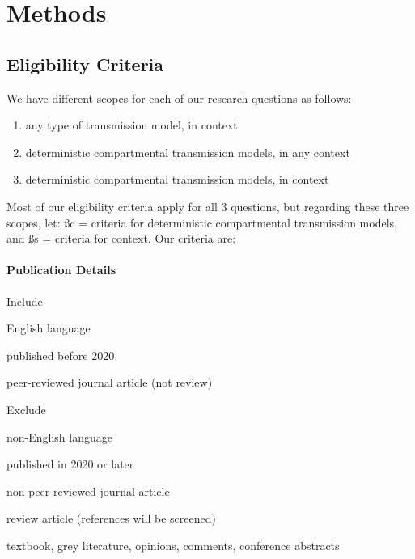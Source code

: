 \documentclass{article}
\begin{document}
\section{Methods}
\label{s:methods}
\subsection{Eligibility Criteria}
\label{ss:eligibility}
We have different scopes for each of our research questions as follows:
\begin{enumerate}[itemsep=0pt]
  \item any type of transmission model, in \ssa context
  \item deterministic compartmental transmission models, in any context
  \item deterministic compartmental transmission models, in \ssa context
\end{enumerate}
Most of our eligibility criteria apply for all 3 questions,
but regarding these three scopes, let:
\ss{c} = criteria for deterministic compartmental transmission models, and
\ss{s} = criteria for \ssa context.
Our criteria are:
\paragraph{Publication Details}\n
\begin{criteria}{Include}
  \item English language
  \item published before 2020
  \item peer-reviewed journal article (not review)
\end{criteria}
\begin{criteria}{Exclude}
  \item non-English language
  \item published in 2020 or later
  \item non-peer reviewed journal article
  \item review article (references will be screened)
  \item textbook, grey literature, opinions, comments, conference abstracts
\end{criteria}
\end{document}

